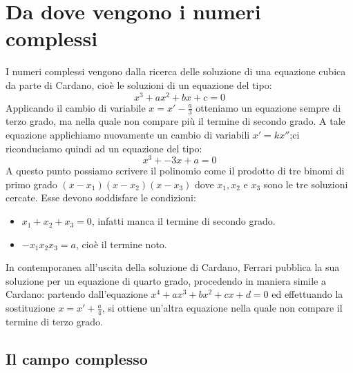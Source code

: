 \chapter{Da dove vengono i numeri complessi}

I numeri complessi vengono dalla ricerca delle soluzione di una equazione cubica da parte di Cardano, cioè le soluzioni di un equazione del tipo:
$$x^3+ax^2+bx+c=0$$
Applicando il cambio di variabile $x=x'-\frac{a}{3}$ otteniamo un equazione sempre di terzo grado, ma nella quale non compare più il termine di secondo grado. A tale equazione applichiamo nuovamente un cambio di variabili $x'=kx''$;ci riconduciamo quindi ad un equazione del tipo:
$$x^3+-3x+a=0$$
A questo punto possiamo scrivere il polinomio come il prodotto di tre binomi di primo grado $(x-x_1) (x-x_2) (x-x_3)$ dove $x_1, x_2$ e $x_3$ sono le tre soluzioni cercate.
Esse devono soddisfare le condizioni:
\begin{itemize}
\item $x_1+x_2+x_3=0$, infatti manca il termine di secondo grado.
\item $-x_1 x_2 x_3=a$, cioè il termine noto.
\end{itemize}
In contemporanea all'uscita della soluzione di Cardano, Ferrari pubblica la sua soluzione per un equazione di quarto grado, procedendo in maniera simile a Cardano: partendo dall'equazione $x^4+ax^3+bx^2+cx+d=0$ ed effettuando la sostituzione $x=x'+\frac{a}{4}$, si ottiene un'altra equazione nella quale non compare il termine di terzo grado.

\section{Il campo complesso}

